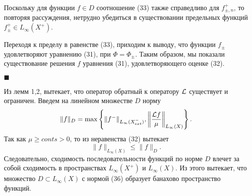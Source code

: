 \documentclass[12pt,reqno]{report}
\begin{document}
Поскольку для функции $f\in D$ соотношение (33) также справедливо
для $f^+_{\pm,n}$, то повторяя рассуждения, нетрудно убедиться в
существовании предельных функций $f^+_{\pm} \in L_{\infty}(X^+)$.


Переходя к пределу в равенстве (33), приходим к выводу, что
функции $f_{\pm}$ удовлетворяют уравнению (31), при
$\Phi=\Phi_{\pm}$. Таким образом, мы показали существование
решения $f$ уравнения (31), удовлетворяющего оценке (32).

$\blacksquare$

Из лемм 1,2, вытекает, что оператор обратный к оператору ${\cal L}$
существует и ограничен. Введем на линейном множестве $D$ норму
\begin{equation}
\|f\|_{D}= \max \left \{\|f^-\|_{L_{\infty}(X^-_{ext})},\left \|\frac{{\cal L}
	f}{\mu} \right\|_{L_{\infty}(X)}\right\}.
\end{equation}
Так как $\mu \geq conts >0$, то из неравенства (32) вытекает
\begin{equation}
\|f\|_{L_{\infty}(X)} \leq \|f\|_{D}.
\end{equation}
Следовательно, сходимость последовательности функций по норме $D$
влечет за собой сходимость в пространствах $L_{\infty}(X^+)$ и
$L_{\infty}(X)$. Из этого вытекает, что множество $D \subset
L_{\infty}(X)$ с нормой (36) образует банахово пространство
функций.
\end{document}
